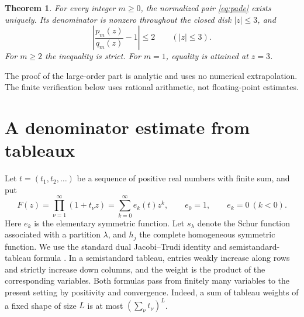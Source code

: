 \documentclass[11pt]{article}
\newtheorem{theorem}{Theorem}
\theoremstyle{remark}\newtheorem{remark}[theorem]{Remark}
\begin{document}
\begin{theorem}\label{thm:main}
For every integer $m\geq0$, the normalized pair \eqref{eq:pade} exists uniquely. Its denominator is nonzero throughout the closed disk $|z|\leq3$, and
\begin{equation}\label{eq:main}
\left|\frac{p_m(z)}{q_m(z)}-1\right|\leq2\qquad(|z|\leq3).
\end{equation}
For $m\geq2$ the inequality is strict. For $m=1$, equality is attained at $z=3$.
\end{theorem}

The proof of the large-order part is analytic and uses no numerical extrapolation. The finite verification below uses rational arithmetic, not floating-point estimates.

\section{A denominator estimate from tableaux}
Let $t=(t_1,t_2,\ldots)$ be a sequence of positive real numbers with finite sum, and put
\[
F(z)=\prod_{\nu=1}^{\infty}(1+t_\nu z)=\sum_{k=0}^{\infty}e_k(t)z^k,
\qquad e_0=1,\qquad e_k=0\ (k<0).
\]
Here $e_k$ is the elementary symmetric function. Let $s_\lambda$ denote the Schur function associated with a partition $\lambda$, and $h_j$ the complete homogeneous symmetric function. We use the standard dual Jacobi--Trudi identity and semistandard-tableau formula \cite{Macdonald}. In a semistandard tableau, entries weakly increase along rows and strictly increase down columns, and the weight is the product of the corresponding variables. Both formulas pass from finitely many variables to the present setting by positivity and convergence. Indeed, a sum of tableau weights of a fixed shape of size $L$ is at most $(\sum_\nu t_\nu)^L$.
\end{document}
